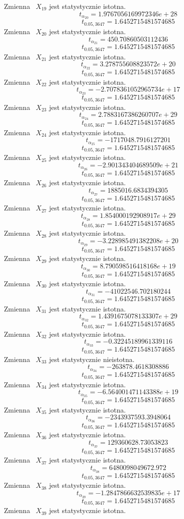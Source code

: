 \documentclass{article}
\begin{document}
Zmienna ~$X_{19}$ jest statystycznie istotna.
\[t_{\alpha_{20}} = 1.9767056169972346e+28\]
\[t_{0.05, 3647} = 1.6452715481574685\]
Zmienna ~$X_{20}$ jest statystycznie istotna.
\[t_{\alpha_{21}} = 450.70860503112436\]
\[t_{0.05, 3647} = 1.6452715481574685\]
Zmienna ~$X_{21}$ jest statystycznie istotna.
\[t_{\alpha_{22}} = 3.278755608823572e+20\]
\[t_{0.05, 3647} = 1.6452715481574685\]
Zmienna ~$X_{22}$ jest statystycznie istotna.
\[t_{\alpha_{23}} = -2.7078361052965734e+17\]
\[t_{0.05, 3647} = 1.6452715481574685\]
Zmienna ~$X_{23}$ jest statystycznie istotna.
\[t_{\alpha_{24}} = 2.7883167386260707e+29\]
\[t_{0.05, 3647} = 1.6452715481574685\]
Zmienna ~$X_{24}$ jest statystycznie istotna.
\[t_{\alpha_{25}} = -1717048.7916127201\]
\[t_{0.05, 3647} = 1.6452715481574685\]
Zmienna ~$X_{25}$ jest statystycznie istotna.
\[t_{\alpha_{26}} = -2.901343404689509e+21\]
\[t_{0.05, 3647} = 1.6452715481574685\]
Zmienna ~$X_{26}$ jest statystycznie istotna.
\[t_{\alpha_{27}} = 1885016.6834394305\]
\[t_{0.05, 3647} = 1.6452715481574685\]
Zmienna ~$X_{27}$ jest statystycznie istotna.
\[t_{\alpha_{28}} = 1.854000192908917e+29\]
\[t_{0.05, 3647} = 1.6452715481574685\]
Zmienna ~$X_{28}$ jest statystycznie istotna.
\[t_{\alpha_{29}} = -3.228985491382208e+20\]
\[t_{0.05, 3647} = 1.6452715481574685\]
Zmienna ~$X_{29}$ jest statystycznie istotna.
\[t_{\alpha_{30}} = 8.790598516418168e+19\]
\[t_{0.05, 3647} = 1.6452715481574685\]
Zmienna ~$X_{30}$ jest statystycznie istotna.
\[t_{\alpha_{31}} = -41022546.702180244\]
\[t_{0.05, 3647} = 1.6452715481574685\]
Zmienna ~$X_{31}$ jest statystycznie istotna.
\[t_{\alpha_{32}} = 1.4391675078133307e+29\]
\[t_{0.05, 3647} = 1.6452715481574685\]
Zmienna ~$X_{32}$ jest statystycznie istotna.
\[t_{\alpha_{33}} = -0.32245189961339116\]
\[t_{0.05, 3647} = 1.6452715481574685\]
Zmienna ~$X_{33}$ jest statystycznie nieistotna.
\[t_{\alpha_{34}} = -263878.4618308886\]
\[t_{0.05, 3647} = 1.6452715481574685\]
Zmienna ~$X_{34}$ jest statystycznie istotna.
\[t_{\alpha_{35}} = -6.564001471143388e+19\]
\[t_{0.05, 3647} = 1.6452715481574685\]
Zmienna ~$X_{35}$ jest statystycznie istotna.
\[t_{\alpha_{36}} = -2343937593.3948064\]
\[t_{0.05, 3647} = 1.6452715481574685\]
Zmienna ~$X_{36}$ jest statystycznie istotna.
\[t_{\alpha_{37}} = 129360628.73053823\]
\[t_{0.05, 3647} = 1.6452715481574685\]
Zmienna ~$X_{37}$ jest statystycznie istotna.
\[t_{\alpha_{38}} = 6480098049672.972\]
\[t_{0.05, 3647} = 1.6452715481574685\]
Zmienna ~$X_{38}$ jest statystycznie istotna.
\[t_{\alpha_{39}} = -1.2847866632539835e+17\]
\[t_{0.05, 3647} = 1.6452715481574685\]
Zmienna ~$X_{39}$ jest statystycznie istotna.
\end{document}
